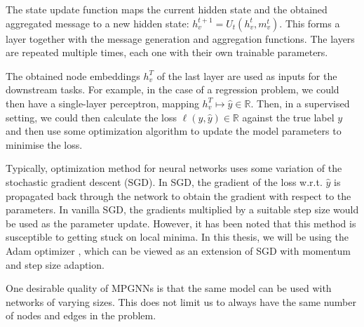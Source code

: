 \documentclass[english, 12pt, a4paper, sci, utf8, a-2b, online]{aaltothesis}
\newcommand{\R}{\mathbb{R}}
\begin{document}
The state update function maps the current hidden state and the obtained aggregated message to a new hidden state: $h_v^{t+1} = U_t(h_v^t, m_v^t)$. This forms a layer together with the message generation and aggregation functions. The layers are repeated multiple times, each one with their own trainable parameters.

The obtained node embeddings $h_v^T$ of the last layer are used as inputs for the downstream tasks. For example, in the case of a regression problem, we could then have a single-layer perceptron, mapping $h_v^T \mapsto \hat{y} \in \R$. Then, in a supervised setting, we could then calculate the loss $\ell(y, \hat{y}) \in \R$ against the true label $y$ and then use some optimization algorithm to update the model parameters to minimise the loss.

Typically, optimization method for neural networks uses some variation of the stochastic gradient descent (SGD). In SGD, the gradient of the loss w.r.t. $\hat{y}$ is propagated back through the network to obtain the gradient with respect to the parameters. In vanilla SGD, the gradients multiplied by a suitable step size would be used as the parameter update. However, it has been noted that this method is susceptible to getting stuck on local minima. In this thesis, we will be using the Adam optimizer \cite{adam-2014}, which can be viewed as an extension of SGD with momentum and step size adaption.

One desirable quality of MPGNNs is that the same model can be used with networks of varying sizes. This does not limit us to always have the same number of nodes and edges in the problem.

 


\end{document}

